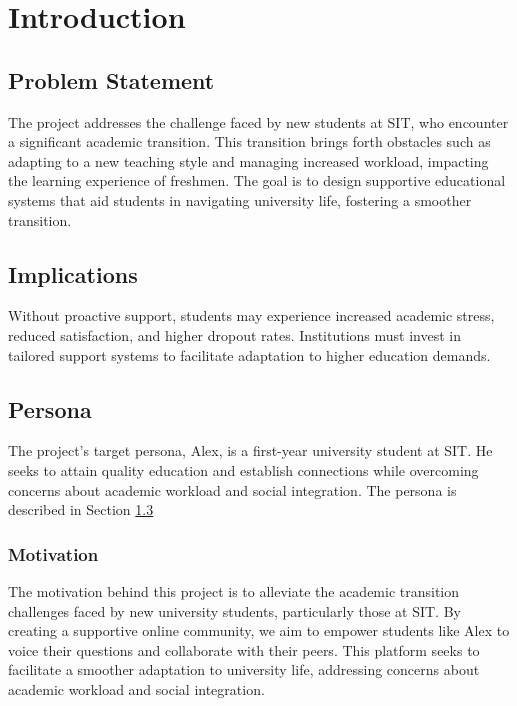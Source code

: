 \chapter{Introduction}\label{introduction}

\section{Problem Statement}\label{problem_statement}
The project addresses the challenge faced by new students at SIT, who encounter a significant academic transition. This transition brings forth obstacles such as adapting to a new teaching style and managing increased workload, impacting the learning experience of freshmen. The goal is to design supportive educational systems that aid students in navigating university life, fostering a smoother transition.

\section{Implications}\label{implications}
Without proactive support, students may experience increased academic stress, reduced satisfaction, and higher dropout rates. Institutions must invest in tailored support systems to facilitate adaptation to higher education demands.

\section{Persona}\label{persona}
The project's target persona, Alex, is a first-year university student at SIT. He seeks to attain quality education and establish connections while overcoming concerns about academic workload and social integration. The persona is described in Section \ref{persona}

\subsection{Motivation}
The motivation behind this project is to alleviate the academic transition challenges faced by new university students, particularly those at SIT. By creating a supportive online community, we aim to empower students like Alex to voice their questions and collaborate with their peers. This platform seeks to facilitate a smoother adaptation to university life, addressing concerns about academic workload and social integration.

